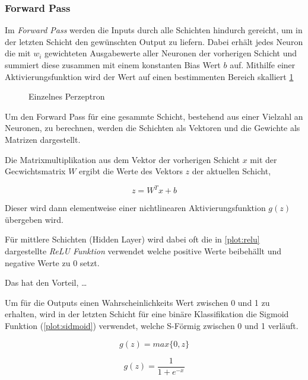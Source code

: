 \subsubsection{Forward Pass}
Im \textit{Forward Pass} werden die Inputs durch alle Schichten hindurch 
gereicht, um in der letzten Schicht den gewünschten Output zu liefern.
Dabei erhält jedes Neuron die mit $w_{i}$ gewichteten Ausgabewerte aller
Neuronen der vorherigen Schicht und summiert diese zusammen mit einem konstanten 
Bias Wert $b$ auf. 
Mithilfe einer Aktivierungsfunktion wird der Wert auf einen bestimmenten Bereich 
skalliert \ref{fig:neuron}


\begin{figure}[H]
    \centering
    \label{fig:neuron}
    
    \caption{Einzelnes Perzeptron}
\end{figure}


Um den Forward Pass für eine gesammte Schicht, bestehend aus 
einer Vielzahl an Neuronen, zu berechnen, werden die Schichten 
als Vektoren und die Gewichte als Matrizen dargestellt.

Die Matrixmultiplikation aus dem Vektor der vorherigen 
Schicht $x$ mit der Gecwichtsmatrix $W$ ergibt die Werte
des Vektors $z$ der aktuellen Schicht,

\begin{equation}
    \label{eq:forward}
    z = W^{T}x+b
\end{equation}

Dieser wird dann elementweise einer nichtlinearen Aktivierungsfunktion
$g(z)$ übergeben wird.

Für mittlere Schichten (Hidden Layer) wird dabei oft die in \ref{plot:relu} dargestellte
\textit{ReLU Funktion} verwendet welche positive Werte beibehällt und negative 
Werte zu 0 setzt.

Das hat den Vorteil, \dots

Um für die Outputs einen Wahrscheinlichkeits Wert zwischen 0 und 1 
zu erhalten, wird in der letzten Schicht für eine binäre Klassifikation 
die Sigmoid Funktion (\ref{plot:sidmoid}) verwendet,
welche S-Förmig zwischen 0 und 1 verläuft.

\vspace{1cm}

\begin{minipage}{0.5\textwidth}
    \centering
    \begin{equation*}
        \label{eq:relu}
        g(z) = max\{0,z\}
    \end{equation*}
\end{minipage}
\begin{minipage}{0.5\textwidth}
    \centering
    \begin{equation*}
        \label{eq:sidmoid}
        g(z) = \frac{1}{1 + e^{-x}}
    \end{equation*}    
\end{minipage}

